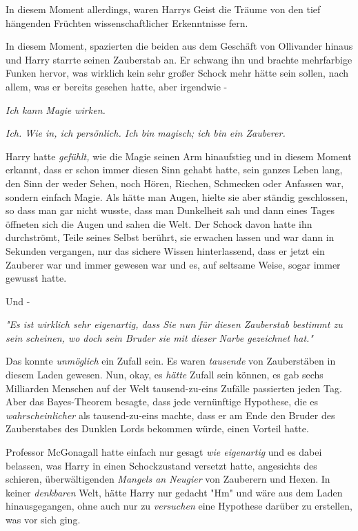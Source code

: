 {In diesem Moment allerdings, waren Harrys Geist die Träume von den tief hängenden Früchten wissenschaftlicher Erkenntnisse fern.

In diesem Moment, spazierten die beiden aus dem Geschäft von Ollivander hinaus und Harry starrte seinen Zauberstab an. Er schwang ihn und brachte mehrfarbige Funken hervor, was wirklich kein sehr großer Schock mehr hätte sein sollen, nach allem, was er bereits gesehen hatte, aber irgendwie -

\emph{Ich kann Magie wirken.}

\emph{Ich. Wie in, ich persönlich. Ich bin magisch; ich bin ein Zauberer.}

Harry hatte \emph{gefühlt,} wie die Magie seinen Arm hinaufstieg und in diesem Moment erkannt, dass er schon immer diesen Sinn gehabt hatte, sein ganzes Leben lang, den Sinn der weder Sehen, noch Hören, Riechen, Schmecken oder Anfassen war, sondern einfach Magie. Als hätte man Augen, hielte sie aber ständig geschlossen, so dass man gar nicht wusste, dass man Dunkelheit sah und dann eines Tages öffneten sich die Augen und sahen die Welt. Der Schock davon hatte ihn durchströmt, Teile seines Selbst berührt, sie erwachen lassen und war dann in Sekunden vergangen, nur das sichere Wissen hinterlassend, dass er jetzt ein Zauberer war und immer gewesen war und es, auf seltsame Weise, sogar immer gewusst hatte.

Und -

\emph{"Es ist wirklich sehr eigenartig, dass Sie nun für diesen Zauberstab bestimmt zu sein scheinen, wo doch sein Bruder sie mit dieser Narbe gezeichnet hat."}

Das konnte \emph{unmöglich} ein Zufall sein. Es waren \emph{tausende} von Zauberstäben in diesem Laden gewesen. Nun, okay, es \emph{hätte} Zufall sein können, es gab sechs Milliarden Menschen auf der Welt tausend-zu-eins Zufälle passierten jeden Tag. Aber das Bayes-Theorem besagte, dass jede vernünftige Hypothese, die es \emph{wahrscheinlicher} als tausend-zu-eins machte, dass er am Ende den Bruder des Zauberstabes des Dunklen Lords bekommen würde, einen Vorteil hatte.

Professor McGonagall hatte einfach nur gesagt \emph{wie eigenartig} und es dabei belassen, was Harry in einen Schockzustand versetzt hatte, angesichts des schieren, überwältigenden \emph{Mangels an Neugier} von Zauberern und Hexen. In keiner \emph{denkbaren} Welt, hätte Harry nur gedacht "Hm" und wäre aus dem Laden hinausgegangen, ohne auch nur zu \emph{versuchen} eine Hypothese darüber zu erstellen, was vor sich ging.

}
